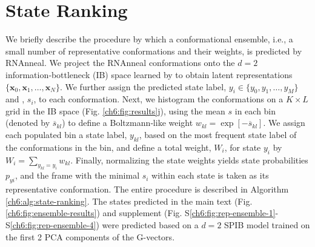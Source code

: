 \section{State Ranking}
       {}
\label{ch6:methods:state-ranking}

We briefly describe the procedure by which a conformational ensemble, i.e., a small number of representative conformations and their weights, is predicted by RNAnneal. We project the RNAnneal conformations onto the $d=2$ information‑bottleneck (IB) space learned by  to obtain latent representations $\{\mathbf{x}_0,\mathbf{x}_1,\ldots,\mathbf{x}_N\}$. We further assign the predicted state label, $y_i \in \{y_0,y_1,\ldots,y_M \}$ and , $s_i$, to each conformation. Next, we histogram the conformations on a $K \times L$ grid in the IB space (Fig. \ref{ch6:fig:results}j), using the mean $s$ in each bin (denoted by $\overline{{s}}_{kl}$) to define a Boltzmann‑like weight
$w_{kl} = \exp[{-\overline{{s}}_{kl}}]$. We assign each populated bin a state label, $y_{kl}$, based on the most frequent state label of the conformations in the bin, and define a total weight, $W_i$, for state $y_i$ by $W_i = \sum_{y_{kl}=y_i} w_{kl}$. Finally, normalizing the state weights yields state probabilities $p_{yi}$, and the frame with the minimal $s_i$ within each state is taken as its representative conformation. The entire procedure is described in Algorithm \ref{ch6:alg:state-ranking}. The states predicted in the main text (Fig. \ref{ch6:fig:ensemble-results}) and supplement (Fig. S\ref{ch6:fig:rep-ensemble-1}-S\ref{ch6:fig:rep-ensemble-4}) were predicted based on a $d=2$ SPIB model trained on the first 2 PCA components of the G-vectors.


